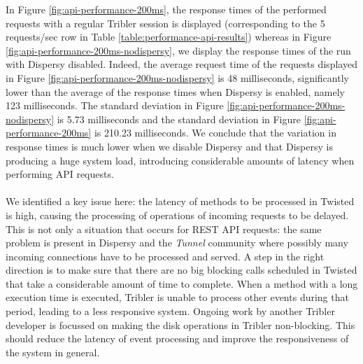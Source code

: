 \noindent In Figure \ref{fig:api-performance-200ms}, the response times of the performed requests with a regular Tribler session is displayed (corresponding to the 5 requests/sec row in Table \ref{table:performance-api-results}) whereas in Figure \ref{fig:api-performance-200ms-nodispersy}, we display the response times of the run with Dispersy disabled. Indeed, the average request time of the requests displayed in Figure \ref{fig:api-performance-200ms-nodispersy} is 48 milliseconds, significantly lower than the average of the response times when Dispersy is enabled, namely 123 milliseconds. The standard deviation in Figure \ref{fig:api-performance-200ms-nodispersy} is 5.73 milliseconds and the standard deviation in Figure \ref{fig:api-performance-200ms} is 210.23 milliseconds. We conclude that the variation in response times is much lower when we disable Dispersy and that Dispersy is producing a huge system load, introducing considerable amounts of latency when performing API requests.\\\\
We identified a key issue here: the latency of methods to be processed in Twisted is high, causing the processing of operations of incoming requests to be delayed. This is not only a situation that occurs for REST API requests: the same problem is present in Dispersy and the \emph{Tunnel} community where possibly many incoming connections have to be processed and served. A step in the right direction is to make sure that there are no big blocking calls scheduled in Twisted that take a considerable amount of time to complete. When a method with a long execution time is executed, Tribler is unable to process other events during that period, leading to a less responsive system. Ongoing work by another Tribler developer is focussed on making the disk operations in Tribler non-blocking. This should reduce the latency of event processing and improve the responsiveness of the system in general.\\\\
